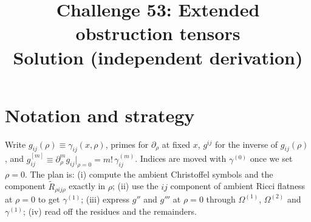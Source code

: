 \documentclass[11pt]{article}
\title{Challenge 53: Extended obstruction tensors \\ \large Solution (independent derivation)}
\date{}
\begin{document}
\maketitle

\section{Notation and strategy}
Write $g_{ij}(\rho)\equiv\gamma_{ij}(x,\rho)$, primes for $\partial_\rho$ at fixed $x$, $g^{ij}$ for the inverse of $g_{ij}(\rho)$, and $g^{[m]}_{ij}\equiv\partial_\rho^mg_{ij}|_{\rho=0}=m!\,\gamma^{(m)}_{ij}$. Indices are moved with $\gamma^{(0)}$ once we set $\rho=0$. The plan is: (i) compute the ambient Christoffel symbols and the component $\tilde R_{\rho ij\rho}$ exactly in $\rho$; (ii) use the $ij$ component of ambient Ricci flatness at $\rho=0$ to get $\gamma^{(1)}$; (iii) express $g''$ and $g'''$ at $\rho=0$ through $\Omega^{(1)}$, $\Omega^{(2)}$ and $\gamma^{(1)}$; (iv) read off the residues and the remainders.
\end{document}
